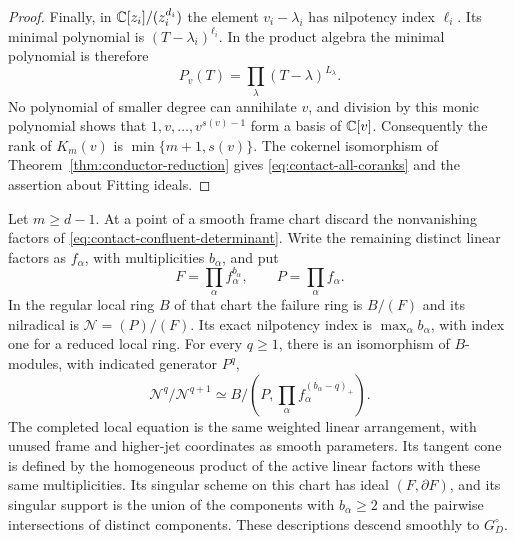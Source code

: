 \begin{proof}
Finally, in $\mathbb C[z_i]/(z_i^{d_i})$ the element $v_i-\lambda_i$
has nilpotency index $\ell_i$. Its minimal polynomial is
$(T-\lambda_i)^{\ell_i}$. In the product algebra the minimal
polynomial is therefore
\begin{equation}\label{eq:contact-minimal-polynomial}
 P_v(T)=\prod_\lambda(T-\lambda)^{L_\lambda}.
\end{equation}
No polynomial of smaller degree can annihilate $v$, and division by
this monic polynomial shows that $1,v,\ldots,v^{s(v)-1}$ form a
basis of $\mathbb C[v]$. Consequently the rank of $K_m(v)$ is
$\min\{m+1,s(v)\}$. The cokernel isomorphism of
Theorem~\ref{thm:conductor-reduction} gives
\eqref{eq:contact-all-coranks} and the assertion about Fitting ideals.
\end{proof}

\begin{theorem}
\label{thm:contact-layers}
Let $m\ge d-1$. At a point of a smooth frame chart discard the
nonvanishing factors of \eqref{eq:contact-confluent-determinant}.
Write the remaining distinct linear factors as $f_\alpha$, with
multiplicities $b_\alpha$, and put
\[
 F=\prod_\alpha f_\alpha^{b_\alpha},\qquad P=\prod_\alpha f_\alpha.
\]
In the regular local ring $B$ of that chart the failure ring is
$B/(F)$ and its nilradical is $\mathcal N=(P)/(F)$. Its exact
nilpotency index is $\max_\alpha b_\alpha$, with index one for a
reduced local ring. For every $q\ge1$, there is an isomorphism
of $B$-modules, with indicated generator $P^q$,
\begin{equation}\label{eq:contact-nilradical-layers}
 \mathcal N^q/\mathcal N^{q+1}
 \simeq
 B\big/\left(P,\prod_\alpha f_\alpha^{(b_\alpha-q)_+}\right).
\end{equation}
The completed local equation is the same weighted linear
arrangement, with unused frame and higher-jet coordinates as smooth
parameters. Its tangent cone is defined by the homogeneous product
of the active linear factors with these same multiplicities.
Its singular scheme on this chart has ideal
$(F,\partial F)$, and its singular support is the union of the
components with $b_\alpha\ge2$ and the pairwise intersections of
distinct components. These descriptions descend smoothly to
$G_D^\circ$.
\end{theorem}
